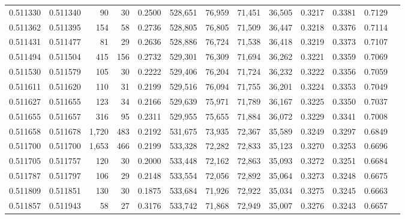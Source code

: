 \begin{tabular}{rrrrrrrrrrrrr}
0.511330 & 0.511340 &    90 &    30 &                                     0.2500 & 528,651 &  76,959 &  71,451 &  36,505 & 0.3217 & 0.3381 & 0.7129 \\
0.511362 & 0.511395 &   154 &    58 &                                     0.2736 & 528,805 &  76,805 &  71,509 &  36,447 & 0.3218 & 0.3376 & 0.7114 \\
0.511431 & 0.511477 &    81 &    29 &                                     0.2636 & 528,886 &  76,724 &  71,538 &  36,418 & 0.3219 & 0.3373 & 0.7107 \\
0.511494 & 0.511504 &   415 &   156 &                                     0.2732 & 529,301 &  76,309 &  71,694 &  36,262 & 0.3221 & 0.3359 & 0.7069 \\
0.511530 & 0.511579 &   105 &    30 &                                     0.2222 & 529,406 &  76,204 &  71,724 &  36,232 & 0.3222 & 0.3356 & 0.7059 \\
0.511611 & 0.511620 &   110 &    31 &                                     0.2199 & 529,516 &  76,094 &  71,755 &  36,201 & 0.3224 & 0.3353 & 0.7049 \\
0.511627 & 0.511655 &   123 &    34 &                                     0.2166 & 529,639 &  75,971 &  71,789 &  36,167 & 0.3225 & 0.3350 & 0.7037 \\
0.511655 & 0.511657 &   316 &    95 &                                     0.2311 & 529,955 &  75,655 &  71,884 &  36,072 & 0.3229 & 0.3341 & 0.7008 \\
0.511658 & 0.511678 & 1,720 &   483 &                                     0.2192 & 531,675 &  73,935 &  72,367 &  35,589 & 0.3249 & 0.3297 & 0.6849 \\
0.511700 & 0.511700 & 1,653 &   466 &                                     0.2199 & 533,328 &  72,282 &  72,833 &  35,123 & 0.3270 & 0.3253 & 0.6696 \\
0.511705 & 0.511757 &   120 &    30 &                                     0.2000 & 533,448 &  72,162 &  72,863 &  35,093 & 0.3272 & 0.3251 & 0.6684 \\
0.511787 & 0.511797 &   106 &    29 &                                     0.2148 & 533,554 &  72,056 &  72,892 &  35,064 & 0.3273 & 0.3248 & 0.6675 \\
0.511809 & 0.511851 &   130 &    30 &                                     0.1875 & 533,684 &  71,926 &  72,922 &  35,034 & 0.3275 & 0.3245 & 0.6663 \\
0.511857 & 0.511943 &    58 &    27 &                                     0.3176 & 533,742 &  71,868 &  72,949 &  35,007 & 0.3276 & 0.3243 & 0.6657 \\

\end{tabular}
